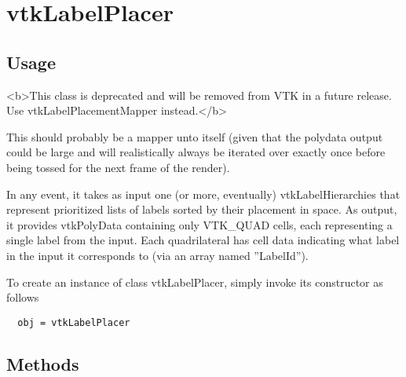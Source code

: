 \section{vtkLabelPlacer}

\subsection{Usage}

 <b>This class is deprecated and will be removed from VTK in a future
 release. Use vtkLabelPlacementMapper instead.</b>

 This should probably be a mapper unto itself (given that
 the polydata output could be large and will realistically
 always be iterated over exactly once before being tossed
 for the next frame of the render).

 In any event, it takes as input one (or more, eventually)
 vtkLabelHierarchies that represent prioritized lists of
 labels sorted by their placement in space. As output, it
 provides vtkPolyData containing only VTK\_QUAD cells, each
 representing a single label from the input. Each quadrilateral
 has cell data indicating what label in the input it
 corresponds to (via an array named ''LabelId'').

To create an instance of class vtkLabelPlacer, simply
invoke its constructor as follows
\begin{verbatim}
  obj = vtkLabelPlacer
\end{verbatim}
\subsection{Methods}

